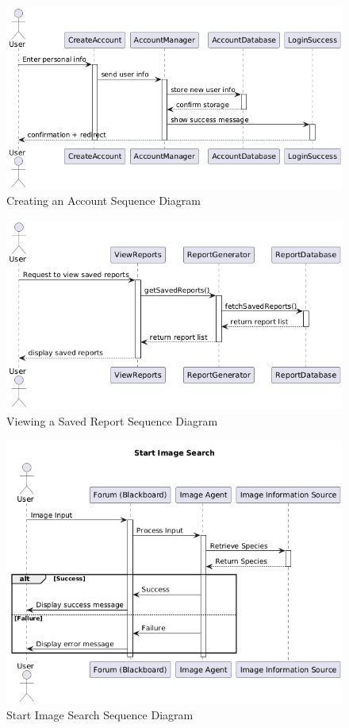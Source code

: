 \documentclass[]{article}
\numberwithin{figure}{section}
\begin{document}
\begin{figure}[h]
    \centering
    \includegraphics[scale=0.7]{CreateAccount_sequence.png}
    \caption{Creating an Account Sequence Diagram}
    \label{fig:CreateAccount_sequence}
\end{figure}
\clearpage

\begin{figure}[h]
    \centering
    \includegraphics[scale=0.7]{ViewSavedReports_sequence.png}
    \caption{Viewing a Saved Report Sequence Diagram}
    \label{fig:ViewSavedReports_sequence}
\end{figure}
\clearpage

\begin{figure}[h]
    \centering
    \includegraphics[scale=0.7]{StartImageSearch_sequence.png}
    \caption{Start Image Search Sequence Diagram}
    \label{fig:ViewSavedReports_sequence}
\end{figure}
\clearpage
\end{document}
